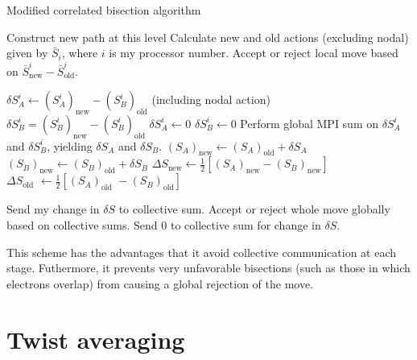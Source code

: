 \documentclass{article}
\begin{document}
\begin{algorithm}
\caption{Modified correlated bisection algorithm}
\begin{algorithmic}
  \STATE Construct new path at this level
\ENDFOR
\STATE Calculate new and old actions (excluding nodal) given by $\bar{S}_i$, 
       where $i$ is my processor number.
\STATE Accept or reject local move based on 
       $\bar{S}^i_\text{new} - \bar{S}^i_\text{old}$.

  \STATE $\delta S_A^i \leftarrow (S_A^i)_\text{new} -
(S_B^i)_\text{old}$ (including nodal action)
  \STATE  $\delta S_B^i = (S_B^i)_\text{new}-(S_B^i)_\text{old}$
\ELSE
  \STATE $\delta S_A^i \leftarrow 0$
  \STATE $\delta S_B^i \leftarrow 0$
\ENDIF
\STATE Perform global MPI sum on $\delta S_A^i$ and $\delta S_B^i$,
       yielding $\delta S_A$ and $\delta S_B$.
\STATE $(S_A)_\text{new} \leftarrow (S_A)_\text{old} + \delta S_A$
\STATE $(S_B)_\text{new} \leftarrow (S_B)_\text{old} + \delta S_B$
\STATE $\Delta S_\text{new} \leftarrow
  \frac{1}{2}\left[(S_A)_\text{new} - (S_B)_\text{new}\right]$
\STATE $\Delta S_\text{old} \, \, \leftarrow
  \frac{1}{2}\left[(S_A)_\text{old} \,\, - (S_B)_\text{old} \right]$



  \STATE Send my change in $\delta S$ to collective sum.
  \STATE Accept or reject whole move globally based on collective sums.
\ELSE
  \STATE Send 0 to collective sum for change in $\delta S$.
\ENDIF

\end{algorithmic}
\end{algorithm}

This scheme has the advantages that it avoid collective communication
at each stage.  Futhermore, it prevents very unfavorable bisections
(such as those in which electrons overlap) from causing a global
rejection of the move.




\section{Twist averaging}
\end{document}
